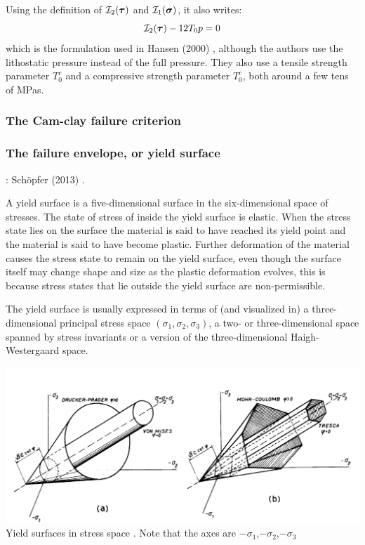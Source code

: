 Using the definition of ${\cal I}_2({\bm \tau})$ and ${\cal I}_1({\bm \sigma})$, it also writes:
\[
{\cal I}_2({\bm \tau}) - 12 T_0 p =0
\]
which is the formulation used in Hansen \etal (2000) \cite{hanl00}, although the authors
use the lithostatic pressure instead of the full pressure. They also use a tensile 
strength parameter $T_0^e$ and a compressive strength parameter $T_0^c$, both around a few tens 
of MPas.

\subsubsection{The Cam-clay failure criterion}



\subsubsection{The failure envelope, or yield surface}
\label{ss:envelope} 

\Literature: Sch{\"o}pfer \etal (2013) \cite{sccm13}.

A yield surface is a five-dimensional surface in the six-dimensional space of stresses. 
The state of stress of inside the yield surface is elastic. 
When the stress state lies on the surface the material is said to have reached its yield point 
and the material is said to have become plastic. Further deformation of the material causes 
the stress state to remain on the yield surface, even though the surface itself may change shape and 
size as the plastic deformation evolves, this is because stress states that lie outside the yield surface are non-permissible.

The yield surface is usually expressed in terms of (and visualized in) a three-dimensional principal stress space $(\sigma_1,\sigma_2,\sigma_3)$, a two- or three-dimensional space spanned by stress invariants 
or a version of the three-dimensional Haigh-Westergaard space. 

\begin{center}
\includegraphics[width=14cm]{images/rheology/surfaces}\\
{\captionfont Yield surfaces in stress space \cite{zico74}. Note that 
the axes are $-\sigma_1$,$-\sigma_2$,$-\sigma_3$}
\end{center} 

